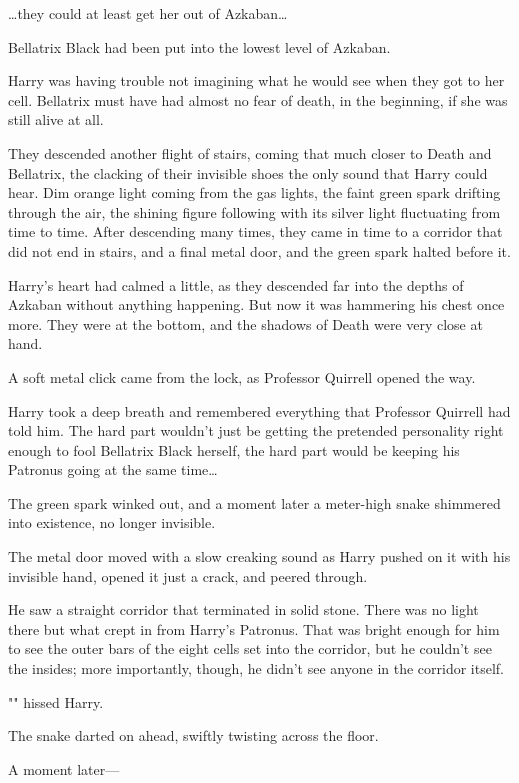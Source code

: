 {\ldots}they could at least get her out of Azkaban{\ldots}

Bellatrix Black had been put into the lowest level of Azkaban.

Harry was having trouble not imagining what he would see when they got to her
cell. Bellatrix must have had almost no fear of death, in the beginning, if she
was still alive at all.

They descended another flight of stairs, coming that much closer to Death and
Bellatrix, the clacking of their invisible shoes the only sound that Harry
could hear. Dim orange light coming from the gas lights, the faint green spark
drifting through the air, the shining figure following with its silver light
fluctuating from time to time.
\later
After descending many times, they came in time to a corridor that did not end
in stairs, and a final metal door, and the green spark halted before it.

Harry's heart had calmed a little, as they descended far into the depths of
Azkaban without anything happening. But now it was hammering his chest once
more. They were at the bottom, and the shadows of Death were very close at hand.

A soft metal click came from the lock, as Professor Quirrell opened the way.

Harry took a deep breath and remembered everything that Professor Quirrell had
told him. The hard part wouldn't just be getting the pretended personality
right enough to fool Bellatrix Black herself, the hard part would be keeping
his Patronus going at the same time{\ldots}

The green spark winked out, and a moment later a meter-high snake shimmered
into existence, no longer invisible.

The metal door moved with a slow creaking sound as Harry pushed on it with his
invisible hand, opened it just a crack, and peered through.

He saw a straight corridor that terminated in solid stone. There was no light
there but what crept in from Harry's Patronus. That was bright enough for him
to see the outer bars of the eight cells set into the corridor, but he couldn't
see the insides; more importantly, though, he didn't see anyone in the corridor
itself.

"" hissed Harry.

The snake darted on ahead, swiftly twisting across the floor.

A moment later---

